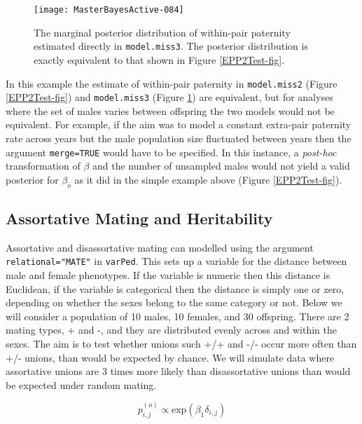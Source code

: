 \documentclass{article}
\begin{document}
\begin{figure}[!h]
\begin{center}
\texttt{[image: MasterBayesActive-084]}
\end{center}
\caption{The marginal posterior distribution of within-pair paternity estimated directly in \texttt{model.miss3}. The posterior distribution is exactly equivalent to that shown in Figure \ref{EPP2Test-fig}.}
\label{EPPmerge-fig}
\end{figure}


In this example the estimate of within-pair paternity in \texttt{model.miss2} (Figure \ref{EPP2Test-fig}) and \texttt{model.miss3} (Figure \ref{EPPmerge-fig}) are equivalent, but for analyses where the set of males varies between offspring the two models would not be equivalent.  For example, if the aim was to model a constant extra-pair paternity rate across years but the male population size fluctuated between years then the argument \texttt{merge=TRUE} would have to be specified.  In this instance, a \emph{post-hoc} transformation of $\beta$ and the number of unsampled males would not yield a valid posterior for $\beta_{o}$ as it did in the simple example above (Figure \ref{EPP2Test-fig}).   

\subsection{Assortative Mating and Heritability}

Assortative and disassortative mating can modelled using the argument \texttt{relational="MATE"} in \texttt{varPed}. This sets up a variable for the distance between male and female phenotypes.  If the variable is numeric then this distance is Euclidean, if the variable is categorical then the distance is simply one or zero, depending on whether the sexes belong to the same category or not.  Below we will consider a population of 10 males, 10 females, and 30 offspring.  There are 2 mating types, + and -, and they are distributed evenly across and within the sexes.   The aim is to test whether unions such +/+ and -/- occur more often than +/- unions, than would be expected by chance.  We will simulate data where assortative unions are 3 times more likely than disassortative unions than would be expected under random mating.  

\begin{equation}
p^{(o)}_{i,j} \propto \textrm{exp}(\beta_{1}\delta_{i,j})
\label{AM-eq}
\end{equation}
\end{document}
